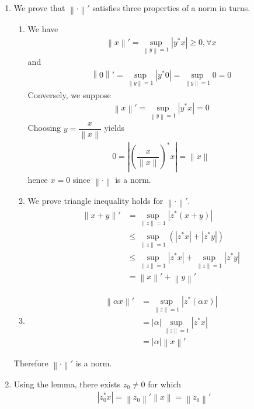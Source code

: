 \documentclass[a4paper,oneside]{book}
\numberwithin{equation}{chapter}
\begin{document}
\begin{enumerate}
\item We prove that $\left\|  \cdot  \right\|'$ satisfies three properties of a norm in turns.
\begin{enumerate}
\item We have
\begin{align}
\left\| x \right\|' = \mathop {\sup }\limits_{\left\| y \right\| = 1} \left| {{y^*}x} \right| \ge 0,\forall x
\end{align}
and
\begin{align}
\left\| 0 \right\|' = \mathop {\sup }\limits_{\left\| y \right\| = 1} \left| {{y^*}0} \right| = \mathop {\sup }\limits_{\left\| y \right\| = 1} 0 = 0
\end{align}
Conversely, we suppose 
\begin{align}
\left\| x \right\|' = \mathop {\sup }\limits_{\left\| y \right\| = 1} \left| {{y^*}x} \right| = 0
\end{align}
Choosing $y = \dfrac{x}{{\left\| x \right\|}}$ yields
\begin{align}
0 = \left| {{{\left( {\dfrac{x}{{\left\| x \right\|}}} \right)}^*}x} \right| = \left\| x \right\|
\end{align}
hence $x=0$ since $\left\| \cdot \right\|$ is a norm.
\item We prove triangle inequality holds for  $\left\|  \cdot  \right\|'$.
\begin{align}
\left\| {x + y} \right\|' &= \mathop {\sup }\limits_{\left\| z \right\| = 1} \left| {{z^*}\left( {x + y} \right)} \right|\\
 &\le \mathop {\sup }\limits_{\left\| z \right\| = 1} \left( {\left| {{z^*}x} \right| + \left| {{z^*}y} \right|} \right)\\
 &\le \mathop {\sup }\limits_{\left\| z \right\| = 1} \left| {{z^*}x} \right| + \mathop {\sup }\limits_{\left\| z \right\| = 1} \left| {{z^*}y} \right|\\
 &= \left\| x \right\|' + \left\| y \right\|'
\end{align}
\item 
\begin{align}
\left\| {\alpha x} \right\|' &= \mathop {\sup }\limits_{\left\| z \right\| = 1} \left| {{z^*}\left( {\alpha x} \right)} \right|\\
 &= \left| \alpha  \right|\mathop {\sup }\limits_{\left\| z \right\| = 1} \left| {{z^*}x} \right|\\
& = \left| \alpha  \right|\left\| x \right\|'
\end{align}
\end{enumerate}
Therefore $\left\|  \cdot  \right\|'$ is a norm.
\item Using the lemma, there exists $z_0 \ne 0$ for which
\begin{align}
\label{1.26}
\left| {{z_0^*}x} \right| = \left\| z_0 \right\|'\left\| x \right\| = \left\| z_0 \right\|'
\end{align}


\end{enumerate}
\end{document}
